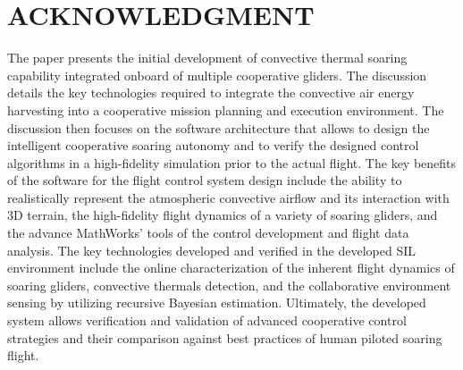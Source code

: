 \documentclass[letterpaper, 10 pt, conference]{ieeeconf}  %
\begin{document}
\section*{ACKNOWLEDGMENT}
 The paper presents the initial development of convective thermal soaring capability integrated onboard of multiple cooperative gliders. The discussion details the key technologies required to integrate
the convective air energy harvesting into a cooperative mission planning and execution environment. The discussion then focuses on the software architecture that allows to design the intelligent cooperative soaring autonomy and to verify the designed control algorithms in a high-fidelity simulation prior to the actual flight. The key benefits of the software for the flight control system design include the ability to realistically represent the atmospheric convective airflow and its interaction with 3D terrain, the high-fidelity flight dynamics of a variety of soaring gliders, and the advance MathWorks' tools of the control development and flight data analysis. The key technologies developed and verified in the developed SIL environment include the online characterization of the inherent flight dynamics of soaring gliders, convective thermals detection, and the collaborative environment sensing by utilizing recursive Bayesian estimation. Ultimately, the developed system allows verification and validation of advanced cooperative control strategies and their comparison against best practices of human piloted soaring flight.
 



\end{document}
